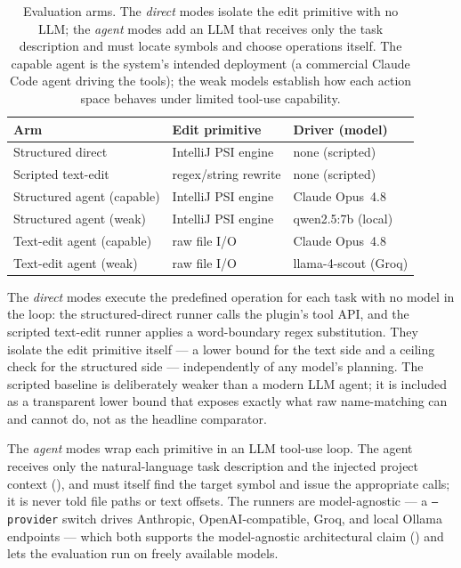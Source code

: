 \begin{table}[t]
  \centering
  \caption{Evaluation arms. The \emph{direct} modes isolate the edit primitive
  with no LLM; the \emph{agent} modes add an LLM that receives only the task
  description and must locate symbols and choose operations itself. The capable
  agent is the system's intended deployment (a commercial Claude Code agent
  driving the tools); the weak models establish how each action space behaves
  under limited tool-use capability.}
  \label{tab:modes}
  \begin{tabular}{@{}lll@{}}
    \toprule
    Arm & Edit primitive & Driver (model) \\
    \midrule
    Structured direct          & IntelliJ PSI engine  & none (scripted) \\
    Scripted text-edit         & regex/string rewrite & none (scripted) \\
    Structured agent (capable) & IntelliJ PSI engine  & Claude Opus~4.8 \\
    Structured agent (weak)    & IntelliJ PSI engine  & qwen2.5:7b (local) \\
    Text-edit agent (capable)  & raw file I/O         & Claude Opus~4.8 \\
    Text-edit agent (weak)     & raw file I/O         & llama-4-scout (Groq) \\
    \bottomrule
  \end{tabular}
\end{table}

The \emph{direct} modes execute the predefined operation for each task with no
model in the loop: the structured-direct runner calls the plugin's tool API, and
the scripted text-edit runner applies a word-boundary regex substitution. They
isolate the edit primitive itself --- a lower bound for the text side and a
ceiling check for the structured side --- independently of any model's planning.
The scripted baseline is deliberately weaker than a modern LLM agent; it is
included as a transparent lower bound that exposes exactly what raw name-matching
can and cannot do, not as the headline comparator.

The \emph{agent} modes wrap each primitive in an LLM tool-use loop. The agent
receives only the natural-language task description and the injected project
context (), and must itself find the target symbol and issue the
appropriate calls; it is never told file paths or text offsets. The runners are
model-agnostic --- a \texttt{--provider} switch drives Anthropic,
OpenAI-compatible, Groq, and local Ollama endpoints --- which both supports the
model-agnostic architectural claim () and lets the
evaluation run on freely available models.

